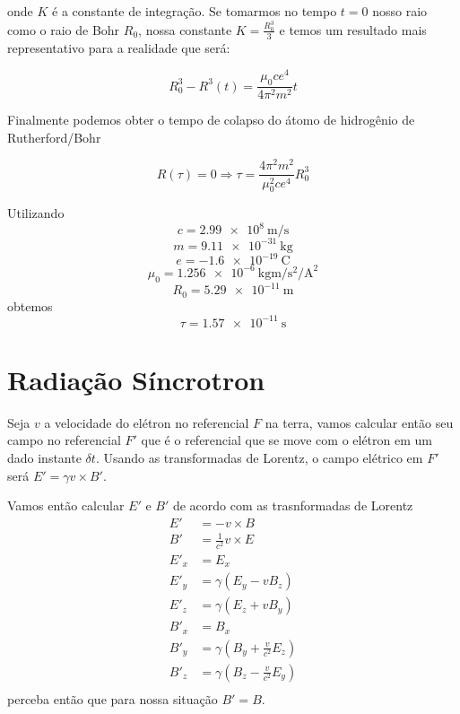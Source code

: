 \documentclass[12pt, letterpaper]{article}
\begin{document}
    onde $K$ é a constante de integração. Se tomarmos no tempo $t = 0$ nosso raio como o raio de Bohr $R_0$, nossa constante $K = \frac{R_0^3}{3}$ e temos um resultado mais representativo para a realidade que será:

    \begin{equation}
        R_0^3 - R^3(t) = \frac{\mu_0ce^4}{4\pi^2m^2}t
    \end{equation}

    Finalmente podemos obter o tempo de colapso do átomo de hidrogênio de Rutherford/Bohr

    \begin{equation}
        R(\tau) = 0 \Rightarrow \tau = \frac{4\pi^2m^2}{\mu_0^2ce^4}R_0^3
    \end{equation}

    Utilizando 
    $$c = \SI[inter-unit-product =\cdot]{2.99e8}{\meter\per\second}$$
    $$m = \SI{9.11e-31}{\kilogram}$$
    $$e = \SI{-1.6e-19}{\coulomb}$$
    $$\mu_0 = \SI[inter-unit-product =\cdot]{1.256e-6}{\kilogram\meter\per\second\squared\per\ampere\squared}$$
    $$R_0 = \SI{5.29e-11}{\meter}$$
    obtemos
    $$\tau = \SI{1.57e-11}{\second}$$


\newpage
\section{Radiação Síncrotron}

    Seja $v$ a velocidade do elétron no referencial $F$ na terra, vamos calcular então seu campo no referencial $F'$ que é o referencial que se move com o elétron em um dado instante $\delta t$. Usando as transformadas de Lorentz, o campo elétrico em $F'$ será $E' = \gamma v\times B'$.

    Vamos então calcular $E'$ e $B'$ de acordo com as trasnformadas de Lorentz
    \begin{equation}
    \begin{split}
        E' &= -v \times B \\
        B' &= \frac{1}{c^2}v \times E \\
        E'_x &= E_x \\
        E'_y &= \gamma(E_y - vB_z) \\
        E'_z &= \gamma(E_z + vB_y) \\
        B'_x &= B_x \\ 
        B'_y &= \gamma(B_y + \frac{v}{c^2}E_z) \\
        B'_z &= \gamma(B_z - \frac{v}{c^2}E_y) \\
    \end{split}
    \end{equation}
    perceba então que para nossa situação $B' = B$.
\end{document}
